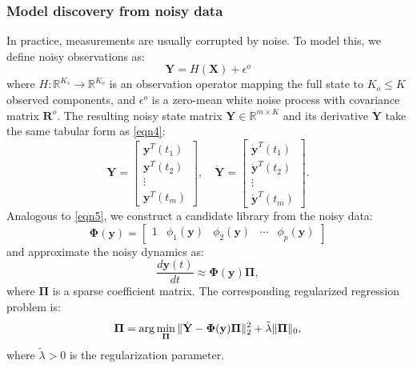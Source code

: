 \documentclass[9pt]{article}
\newcommand\bfX{\mathbf{X}}
\newcommand\bfY{\mathbf{Y}}
\newcommand\bfy{\mathbf{y}}
\numberwithin{equation}{section}
\begin{document}
\subsubsection{Model discovery from noisy data}
In practice, measurements are usually corrupted by noise. To model this, we define noisy observations as:
\begin{equation}\label{eqn8}
    \bfY=H(\bfX)+ \epsilon^o %
\end{equation}
where $H: \mathbb{R}^{K_s} \to \mathbb{R}^{K_o}$ is an observation operator mapping the full state to $K_o \leq K$ observed components, and $\epsilon^o $ is a zero-mean white noise process with covariance matrix $\mathbf{R}^o$.
The resulting noisy state matrix $\bfY \in \mathbb{R}^{m \times K}$ and its derivative $\dot{\bfY}$ take the same tabular form as \eqref{eqn4}:
\begin{equation}\label{eqn9}
    \bfY=
    \begin{bmatrix}
        \bfy^T(t_1)\\\bfy^T(t_2)\\\vdots\\\bfy^T(t_m)
    \end{bmatrix},
    \quad
    \dot{\bfY}=
    \begin{bmatrix}
        \dot{\bfy}^T(t_1)\\\dot{\bfy}^T(t_2)\\\vdots\\\dot{\bfy}^T(t_m)
    \end{bmatrix}.
\end{equation}
Analogous to \eqref{eqn5}, we construct a candidate library from the noisy data:
\begin{equation}\label{eqn10}
    \boldsymbol{\Phi}(\bfy)=
    \begin{bmatrix} 
        1&\phi_1(\bfy)&\phi_2(\bfy)&\cdots&\phi_p(\bfy)
    \end{bmatrix}
\end{equation}
and approximate the noisy dynamics as:
\begin{equation}\label{eqn11}
    \frac{d\bfy(t)}{dt}\approx\boldsymbol{\Phi}(\bfy)\boldsymbol{\Pi},
\end{equation}
where $\boldsymbol{\Pi}$ is a sparse coefficient matrix. The corresponding regularized regression problem is:
\begin{equation}\label{eqn12}
    \boldsymbol{\Pi}=\arg\min_{\boldsymbol{\Pi}}\|\dot{\bfY}- \boldsymbol{\Phi}(\bfy)\boldsymbol{\Pi}\|_2^2 + \Tilde{\lambda}\|\boldsymbol{\Pi}\|_0,
\end{equation}
where $\tilde{\lambda} > 0$ is the regularization parameter. 
\end{document}
